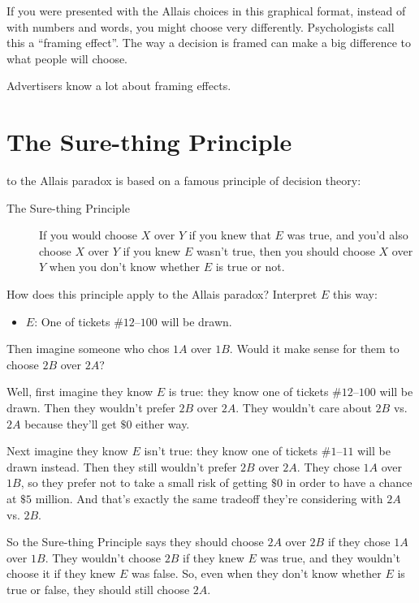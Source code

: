 \documentclass[justified]{tufte-book}
\providecommand{\tightlist}{%
  \setlength{\itemsep}{0pt}\setlength{\parskip}{0pt}}
\theoremstyle{definition}
\theoremstyle{definition}
\theoremstyle{definition}
\theoremstyle{remark}
\begin{document}
If you were presented with the Allais choices in this graphical format,
instead of with numbers and words, you might choose very differently.
Psychologists call this a ``framing effect''. The way a decision is
framed can make a big difference to what people will choose.

Advertisers know a lot about framing effects.

\hypertarget{the-sure-thing-principle}{%
\section{The Sure-thing Principle}\label{the-sure-thing-principle}}

 to the Allais paradox is based on a famous
principle of decision theory:

\begin{description}
\item[The Sure-thing Principle]
If you would choose \(X\) over \(Y\) if you knew that \(E\) was true,
and you'd also choose \(X\) over \(Y\) if you knew \(E\) wasn't true,
then you should choose \(X\) over \(Y\) when you don't know whether
\(E\) is true or not.
\end{description}

How does this principle apply to the Allais paradox? Interpret \(E\)
this way:

\begin{itemize}
\tightlist
\item
  \(E\): One of tickets \#\(12\)--\(100\) will be drawn.
\end{itemize}

Then imagine someone who chos \(1A\) over \(1B\). Would it make sense
for them to choose \(2B\) over \(2A\)?

Well, first imagine they know \(E\) is true: they know one of tickets
\(\#12\)--\(100\) will be drawn. Then they wouldn't prefer \(2B\) over
\(2A\). They wouldn't care about \(2B\) vs. \(2A\) because they'll get
\(\$0\) either way.

Next imagine they know \(E\) isn't true: they know one of tickets
\(\#1\)--\(11\) will be drawn instead. Then they still wouldn't prefer
\(2B\) over \(2A\). They chose \(1A\) over \(1B\), so they prefer not to
take a small risk of getting \(\$0\) in order to have a chance at
\(\$5\) million. And that's exactly the same tradeoff they're
considering with \(2A\) vs. \(2B\).

So the Sure-thing Principle says they should choose \(2A\) over \(2B\)
if they chose \(1A\) over \(1B\). They wouldn't choose \(2B\) if they
knew \(E\) was true, and they wouldn't choose it if they knew \(E\) was
false. So, even when they don't know whether \(E\) is true or false,
they should still choose \(2A\).
\end{document}

